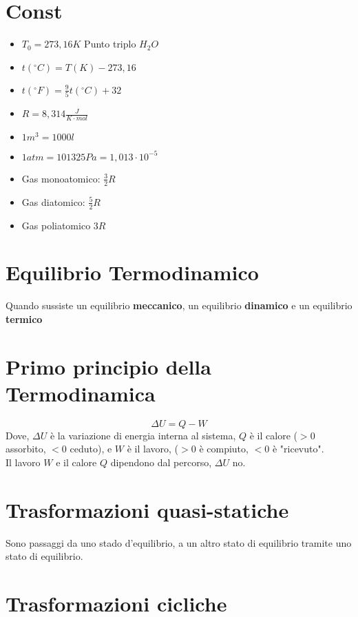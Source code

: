 \documentclass[a4paper]{report}
\begin{document}
  \section{Const}
  \begin{itemize}
    \item $T_0 = 273,16 K$ Punto triplo $H_2O$
    \item $t(^\circ C)= T(K) - 273,16$
    \item $t(^\circ F)= \frac{9}{5} t(^\circ C) + 32$
    \item $R = 8,314 \frac{J}{K \cdot mol}$
    \item $1 m^3 = 1000l$
    \item $1 atm = 101325Pa = 1,013 \cdot 10^{-5}$
    \item Gas monoatomico: $\frac{3}{2}R$
    \item Gas diatomico: $\frac{5}{2}R$
    \item Gas poliatomico $3 R$
  \end{itemize}

  \section{Equilibrio Termodinamico}
  Quando sussiste un equilibrio \textbf{meccanico}, un equilibrio \textbf{dinamico} e un equilibrio \textbf{termico}

  \section{Primo principio della Termodinamica}
  \[ \Delta U = Q - W \]
  Dove, $\Delta U$ è la variazione di energia interna al sistema, $Q$ è il calore ($>0$ assorbito, $<0$ ceduto), e $W$ è il lavoro, ($>0$ è compiuto, $<0$ è "ricevuto".\\
  Il lavoro $W$ e il calore $Q$ dipendono dal percorso, $\Delta U$ no.

  \section{Trasformazioni quasi-statiche}
  Sono passaggi da uno stado d'equilibrio, a un altro stato di equilibrio tramite uno stato di equilibrio.

  \section{Trasformazioni cicliche}
\end{document}
